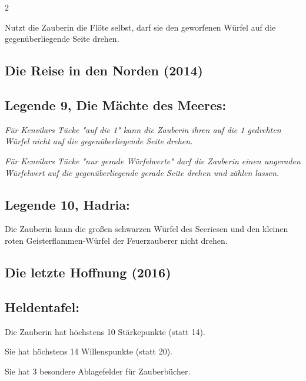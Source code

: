 \documentclass[10pt, a4paper, oneside]{book}
\newcommand{\fan}[1]{\textit{#1}}
\begin{document}
\begin{multicols*}{2}
\begin{bgcolor}
Nutzt die Zauberin die Flöte selbst, darf sie den geworfenen Würfel auf die gegenüberliegende Seite drehen.
\supercite{stsch-gaben,stsch-begleitheft}

\end{bgcolor}


\begin{bgcolor}
\section{Die Reise in den Norden (2014)}


\subsection{Legende 9, Die Mächte des Meeres:}

\fan{Für Kenvilars Tücke "auf die 1" kann die Zauberin ihren auf die 1 gedrehten Würfel nicht auf die gegenüberliegende Seite drehen.}

\fan{Für Kenvilars Tücke "nur gerade Würfelwerte" darf die Zauberin einen ungeraden Würfelwert auf die gegenüberliegende gerade Seite drehen und zählen lassen.}
 

\subsection{Legende 10, Hadria:}

Die Zauberin kann die großen schwarzen Würfel des Seeriesen\supercite{dridn10-turm-bewahrt} und den kleinen roten Geisterflammen-Würfel der Feuerzauberer\supercite{dridn10-geisterflammen} nicht drehen.

\end{bgcolor}




\begin{bgcolor}
\section{Die letzte Hoffnung (2016)}

\subsection{Heldentafel:}

Die Zauberin hat höchstens 10 Stärkepunkte (statt 14).

Sie hat höchstens 14 Willenspunkte (statt 20).

Sie hat 3 besondere Ablagefelder für Zauberbücher.





\end{bgcolor}
\end{multicols*}
\end{document}
